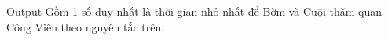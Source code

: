Output
Gồm 1 số duy nhất là thời gian nhỏ nhất để Bờm và Cuội thăm quan Công Viên theo nguyên tắc trên.